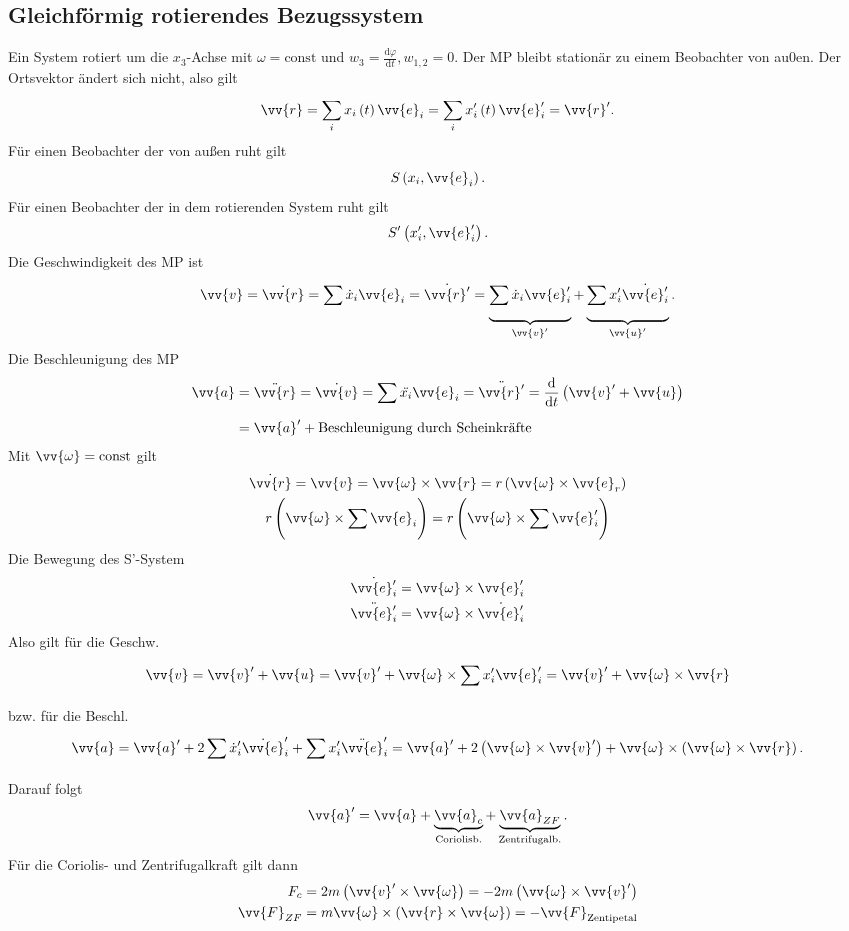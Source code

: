 \documentclass[a4paper,12pt]{article}
\numberwithin{equation}{section}
\begin{document}
\subsection{Gleichförmig rotierendes Bezugssystem}
Ein System rotiert um die $x_3$-Achse mit $\omega =\text{const}$ und $w_3=\tfrac{\text{d}\varphi }{\text{d}t},w_{1,2}=0$. Der MP bleibt stationär zu einem Beobachter von au0en. Der Ortsvektor ändert sich nicht, also gilt
\[ 
        \vv{r}=\sum_{i}^{}x_i\left(t\right)\vv{e}_i=\sum_{i}^{}x_i'\left(t\right)\vv{e}_i'=\vv{r}'
.\] 
Für einen Beobachter der von außen ruht gilt
\[ 
        S\left(x_i,\vv{e}_i\right)
.\] 
Für einen Beobachter der in dem rotierenden System ruht gilt
\[ 
        S'\left(x_i',\vv{e}_i'\right)
.\] 
Die Geschwindigkeit des MP ist
\[ 
        \vv{v}=\dot{\vv{r}}=\sum_{}^{}\dot{x}_i\vv{e}_i=\dot{\vv{r}'}=\underbrace{\sum_{}^{}\dot{x}_i\vv{e}_i'}_{\vv{v}'}+\underbrace{\sum_{}^{}x_i'\dot{\vv{e}_i'}}_{\vv{u}'}
.\] 
Die Beschleunigung des MP
\begin{align*}
        \vv{a}&=\ddot{\vv{r}}=\dot{\vv{v}}=\sum_{}^{}\ddot{x_i}\vv{e}_i=\ddot{\vv{r}'}=\dfrac{\text{d}}{\text{d}t}\left(\vv{v}'+\vv{u}\right)\\
              &=\vv{a}'+\text{Beschleunigung durch Scheinkräfte}
\end{align*}
Mit $\vv{\omega }=\text{const}$ gilt
\begin{gather*}
        \dot{\vv{r}}=\vv{v}=\vv{\omega }\times\vv{r}=r\left(\vv{\omega }\times\vv{e}_r\right)\\
        r\left(\vv{\omega }\times \sum_{}^{}\vv{e}_i\right)=r\left(\vv{\omega }\times \sum_{}^{}\vv{e}_i'\right)
\end{gather*}
Die Bewegung des S'-System 
\begin{align*}
        \dot{\vv{e}_i'}&=\vv{\omega }\times \vv{e}_i'\\
        \ddot{\vv{e}_i'}&=\vv{\omega }\times \dot{\vv{e}_i'}
\end{align*}
Also gilt für die Geschw.
\[
        \vv{v}=\vv{v}'+\vv{u}=\vv{v}'+\vv{\omega }\times \sum_{}^{}x_i'\vv{e}_i'=\vv{v}'+\vv{\omega }\times\vv{r} 
\]
bzw. für die Beschl.
\[ 
        \vv{a}=\vv{a}'+2\sum_{}^{}\dot{x}_i'\dot{\vv{e}}_i'+\sum_{}^{}x_i'\ddot{\vv{e}}_i'=\vv{a}'+2\left(\vv{\omega }\times\vv{v}'\right)+\vv{\omega }\times\left(\vv{\omega }\times\vv{r}\right)
.\] 
Darauf folgt
\[ 
        \vv{a}'=\vv{a}+\underbrace{\vv{a}_c}_{\text{Coriolisb.}}+\underbrace{\vv{a}_{ZF}}_{\text{Zentrifugalb.}}
.\] 
Für die Coriolis- und Zentrifugalkraft gilt dann
\begin{align*}
        F_c&=2m\left(\vv{v}'\times \vv{\omega }\right)=-2m\left(\vv{\omega }\times\vv{v}'\right)\\
        \vv{F}_{ZF}&=m\vv{\omega }\times\left(\vv{r}\times\vv{\omega }\right)=-\vv{F}_{\text{Zentipetal}}
\end{align*}
\end{document}
